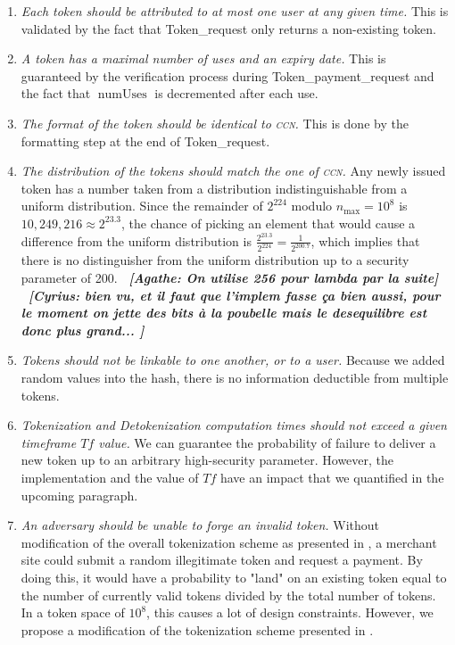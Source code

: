 \documentclass{llncs}
\DeclareMathOperator{\numUses}{numUses}
\newcounter{prob}
\newcommand{\ab}[1]{\emph{\bf \color{blue}~[Agathe: #1]}}
\newcommand{\cn}[1]{\emph{\bf \color{purple}~[Cyrius: #1]}}
\begin{document}
\begin{enumerate}
    \item \textit{Each token should be attributed to at most one user at any given time.} This is validated by the fact that Token\_request only returns a non-existing token.
    \item \textit{A token has a maximal number of uses and an expiry date.} This is guaranteed by the verification process during Token\_payment\_request and the fact that $\numUses$ is decremented after each use.
    \item \textit{The format of the token should be identical to \textsc{ccn}.} This is done by the formatting step at the end of Token\_request.
    \item \textit{The distribution of the tokens should match the one of \textsc{ccn}.} Any newly issued token has a number taken from a distribution indistinguishable from a uniform distribution. Since the remainder of $2^{224}$ modulo $n_{\max} = 10^8$ is $10,249,216 \approx 2^{23.3}$, the chance of picking an element that would cause a difference from the uniform distribution is $\frac{2^{23.3}}{2^{224}} = \frac{1}{2^{200.7}}$, which implies that there is no distinguisher from the uniform distribution up to a security parameter of 200. \ab{On utilise 256 pour lambda par la suite} \cn{bien vu, et il faut que l'implem fasse ça bien aussi, pour le moment on jette des bits à la poubelle mais le desequilibre est donc plus grand... }
    \item \textit{Tokens should not be linkable to one another, or to a user.} Because we added random values into the hash, there is no information deductible from multiple tokens.
    \item \textit{Tokenization and Detokenization computation times should not exceed a given timeframe $Tf$ value.} We can guarantee the probability of failure to deliver a new token up to an arbitrary high-security parameter. However, the implementation and the value of $Tf$ have an impact that we quantified in the upcoming paragraph. 
    
    \item \textit{An adversary should be unable to forge an invalid token. } Without modification of the overall tokenization scheme as presented in \cite{ref}, a merchant site could submit a random illegitimate token and request a payment. By doing this, it would have a probability to "land" on an existing token equal to the number of currently valid tokens divided by the total number of tokens. In a token space of $10^8$, this causes a lot of design constraints. However, we propose a modification of the tokenization scheme presented in \cite{otherref}.
    
\end{enumerate}
\end{document}
